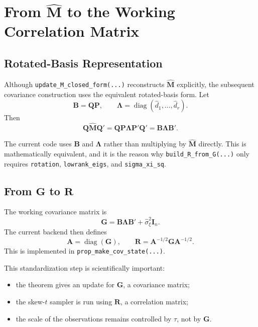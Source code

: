 \documentclass[11pt]{article}
\newcommand{\bQ}{\mathbf{Q}}
\newcommand{\bB}{\mathbf{B}}
\newcommand{\bR}{\mathbf{R}}
\newcommand{\bG}{\mathbf{G}}
\newcommand{\bM}{\mathbf{M}}
\newcommand{\bP}{\mathbf{P}}
\newcommand{\bA}{\mathbf{A}}
\newcommand{\diag}{\operatorname{diag}}
\newcommand{\I}{\mathbf{I}}
\begin{document}
\section{From \texorpdfstring{$\widehat{\bM}$}{M-hat} to the Working Correlation Matrix}

\subsection{Rotated-Basis Representation}

Although \texttt{update\_M\_closed\_form(...)} reconstructs
\(\widehat{\bM}\) explicitly, the subsequent covariance construction uses the
equivalent rotated-basis form. Let
\[
\bB = \bQ \bP,
\qquad
\bm{\Lambda} = \diag(\widehat d_1,\ldots,\widehat d_r).
\]
Then
\begin{equation}
\bQ \widehat{\bM} \bQ'
=
\bQ \bP \bm{\Lambda} \bP' \bQ'
=
\bB \bm{\Lambda} \bB'.
\label{eq:rot-basis}
\end{equation}

The current code uses \(\bB\) and \(\bm{\Lambda}\) rather than multiplying by
\(\widehat{\bM}\) directly. This is mathematically equivalent, and it is the
reason why \texttt{build\_R\_from\_G(...)} only requires
\texttt{rotation}, \texttt{lowrank\_eigs}, and \texttt{sigma\_xi\_sq}.

\subsection{From \texorpdfstring{$\bG$}{G} to \texorpdfstring{$\bR$}{R}}

The working covariance matrix is
\begin{equation}
\bG = \bB \bm{\Lambda} \bB' + \widehat{\sigma}_\xi^2 \I_n.
\label{eq:g-matrix}
\end{equation}
The current backend then defines
\[
\bA = \diag(\bG),
\qquad
\bR = \bA^{-1/2} \bG \bA^{-1/2}.
\]
This is implemented in \texttt{prop\_make\_cov\_state(...)}.

This standardization step is scientifically important:

\begin{itemize}
\item the theorem gives an update for \(\bG\), a covariance matrix;
\item the skew-$t$ sampler is run using \(\bR\), a correlation matrix;
\item the scale of the observations remains controlled by \(\tau\), not by
\(\bG\).
\end{itemize}
\end{document}
